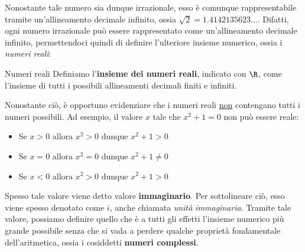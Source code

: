 \documentclass[a4paper, 12pt]{report}
\begin{document}
    
    Nonostante tale numero sia dunque irrazionale, esso è comunque rappresentabile tramite un'allineamento decimale infinito, ossia $\sqrt{2} = 1.4142135623\ldots$. Difatti, ogni numero irrazionale può essere rappresentato come un'allineamento decimale infinito, permettendoci quindi di definire l'ulteriore insieme numerico, ossia i \textit{numeri reali}:

    \begin{frameddefn}{Numeri reali}
        Definiamo l'\textbf{insieme dei numeri reali}, indicato con $\R$, come l'insieme di tutti i possibili allineamenti decimali finiti e infiniti.
    \end{frameddefn}

    Nonostante ciò, è opportuno evidenziare che i numeri reali \underline{non} contengano tutti i numeri possibili. Ad esempio, il valore $x$ tale che $x^2+1 = 0$ non può essere reale:
    \begin{itemize}
        \item Se $x > 0$ allora $x^2 > 0$ dunque $x^2 + 1 > 0$
        \item Se $x = 0$ allora $x^2 = 0$ dunque $x^2 + 1 \neq 0$
        \item Se $x < 0$ allora $x^2 > 0$ dunque $x^2 + 1 > 0$
    \end{itemize}

    Spesso tale valore viene detto valore \textbf{immaginario}. Per sottolineare ciò, esso viene spesso denotato come $i$, anche chiamata \textit{unità immaginaria}. Tramite tale valore, possiamo definire quello che è a tutti gli effetti l'insieme numerico più grande possibile senza che si vada a perdere qualche proprietà fondamentale dell'aritmetica, ossia i cosiddetti \textbf{numeri complessi}.
\end{document}
